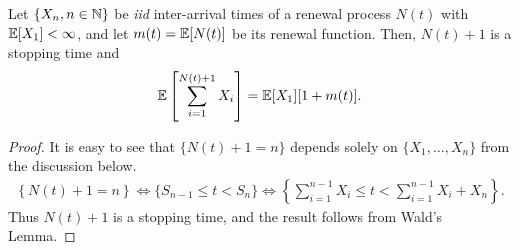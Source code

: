 \documentclass[a4paper,10pt,english]{article}
\begin{document}
\begin{prop} \label{prop:WaldRenewal}
	Let $\{X_n, n \in \mathbb{N}\}$ be \textit{iid} inter-arrival times of a renewal process $N(t)$ with $\mathbb{E}[X_1] < \infty$, and let $m(t) = \mathbb{E}[N(t)]$ be its renewal function. Then, $N(t)+1$ is a stopping time and 
	\begin{align*}
	\mathbb{E}\left[\sum_{i=1}^{N(t)+1}X_i\right] = \mathbb{E}[X_1][1+m(t)].
	\end{align*}
\end{prop}
\begin{proof} It is easy to see that $\{N(t)+1=n\}$ depends solely on $\{X_1,\ldots,X_n\}$ from the discussion below.
	\begin{align*}
	\left\{N(t) + 1 = n \right\} \iff \{S_{n-1} \leq t < S_n\} \iff \left\{\sum_{i=1}^{n-1} X_i \leq t < \sum_{i=1}^{n-1} X_i + X_n\right\}.
	\end{align*}
	Thus $N(t)+1$ is a stopping time, and the result follows from Wald's Lemma.
\end{proof}
\end{document}
